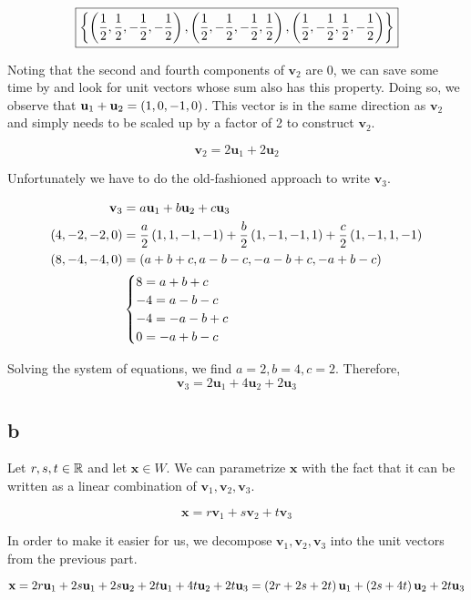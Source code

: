\documentclass{article}
\begin{document}
$$
\boxed{\left \{ \left ( \frac{1}{2}, \frac{1}{2}, -\frac{1}{2}, -\frac{1}{2} \right), \left ( \frac{1}{2}, -\frac{1}{2}, -\frac{1}{2}, \frac{1}{2} \right), \left ( \frac{1}{2}, -\frac{1}{2}, \frac{1}{2}, -\frac{1}{2} \right) \right \}}
$$

Noting that the second and fourth components of $\bm{v}_2$ are 0, we can save some time by and look for unit vectors whose sum also has this property.
Doing so, we observe that $\textbf{u}_1 + \textbf{u}_2 = \left ( 1, 0, -1, 0 \right)$.
This vector is in the same direction as $\bm{v}_2$ and simply needs to be scaled up by a factor of 2 to construct $\bm{v}_2$.

$$
\boxed{\bm{v}_2 = 2 \bm{u}_1 + 2 \bm{u}_2}
$$

Unfortunately we have to do the old-fashioned approach to write $\bm{v}_3$.

\begin{align*}
  \textbf{v}_3 &= a \textbf{u}_1 + b \textbf{u}_2 + c \textbf{u}_3 \\
  \left ( 4, -2, -2, 0 \right) &= \frac{a}{2} \left ( 1, 1, -1, -1 \right) + \frac{b}{2} \left ( 1, -1, -1, 1 \right) + \frac{c}{2} \left ( 1, -1, 1, -1 \right) \\
  \left ( 8, -4, -4, 0 \right) &= \left ( a + b + c, a - b - c, -a - b + c, -a + b - c \right) \\
  &\begin{cases}
    8 = a + b +c \\
    -4 = a - b -c \\
    -4 = -a - b + c \\
    0 = -a + b - c \\
  \end{cases}
\end{align*}

Solving the system of equations, we find $a=2, b=4, c=2$.
Therefore,
$$
\boxed{\bm{v}_3 = 2 \bm{u}_1 + 4 \bm{u}_2 + 2 \bm{u}_3}
$$

\subsection*{b}

Let $r, s, t \in \mathbb R$ and let $\bm{x} \in W$.
We can parametrize $\bm{x}$ with the fact that it can be written as a linear combination of $\bm{v}_1, \bm{v}_2, \bm{v}_3$.

$$
\bm{x} = r \bm{v}_1 + s \bm{v}_2 + t \bm{v}_3
$$

In order to make it easier for us, we decompose $\bm{v}_1, \bm{v}_2, \bm{v}_3$ into the unit vectors from the previous part.

$$
\textbf{x} = 2 r \textbf{u}_1 + 2 s \textbf{u}_1 + 2 s \textbf{u}_2 + 2t \textbf{u}_1 + 4t \textbf{u}_2 + 2t \textbf{u}_3 = \left ( 2r + 2s + 2t \right) \textbf{u}_1 + \left ( 2s + 4t \right) \textbf{u}_2 + 2t \textbf{u}_3
$$
\end{document}
